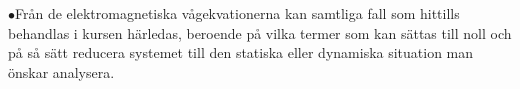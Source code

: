 \item{$\bullet$}{Fr{\aa}n de elektromagnetiska v{\aa}gekvationerna kan
  samtliga fall som hittills behandlas i kursen h{\"a}rledas, beroende
  p{\aa} vilka termer som kan s{\"a}ttas till noll och p{\aa} s{\aa} s{\"a}tt
  reducera systemet till den statiska eller dynamiska situation man {\"o}nskar
  analysera.}
\index
\bye
